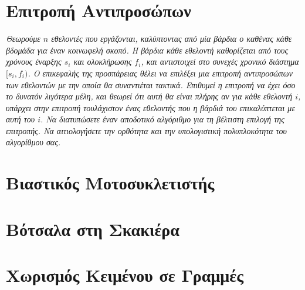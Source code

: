 \documentclass[a4paper,10pt]{article} \usepackage{anysize}
\begin{document}
\renewcommand{\labelenumi}{\roman{enumi})}
\renewcommand{\labelenumii}{(\arabic{enumii})}



\section{Επιτροπή Αντιπροσώπων} \setcounter{section}{1}
\textit{Θεωρούμε $n$ εθελοντές που εργάζονται, καλύπτοντας από μία βάρδια ο καθένας
κάθε βδομάδα για έναν κοινωφελή σκοπό. Η βάρδια κάθε εθελοντή καθορίζεται από
τους χρόνους έναρξης $s_i$ και ολοκλήρωσης $f_i$, και αντιστοιχεί στο συνεχές
χρονικό διάστημα $[s_i,f_i)$. Ο επικεφαλής της προσπάρειας θέλει να επιλέξει
μια επιτροπή αντιπροσώπων των εθελοντών με την οποία θα συναντιέται τακτικά.
Επιθυμεί η επιτροπή να έχει όσο το δυνατόν λιγότερα μέλη, και θεωρεί ότι αυτή
θα είναι πλήρης αν για κάθε εθελοντή $i$, υπάρχει στην επιτροπή τουλάχιστον
ένας εθελοντής που η βάρδιά του επικαλύπτεται με αυτή του $i$. Να διατυπώσετε
έναν αποδοτικό αλγόριθμο για τη βέλτιστη επιλογή της επιτροπής. Να
αιτιολογήσετε την ορθότητα και την υπολογιστική πολυπλοκότητα του αλγορίθμου
σας.}



\vspace{3cm}

\section{Βιαστικός Μοτοσυκλετιστής}


\vspace{3cm}

\section{Βότσαλα στη Σκακιέρα}


\vspace{3cm}

\section{Χωρισμός Κειμένου σε Γραμμές}


\vspace{3cm}
\end{document}
